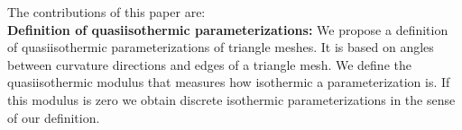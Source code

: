 \documentclass[twoside]{article}
\begin{document}


\newpage
\noindent The contributions of this paper are:\\
\noindent\textbf{Definition of quasiisothermic parameterizations:} 
We propose a definition of quasiisothermic parameterizations of triangle meshes. 
It is based on angles between curvature directions and edges of a triangle mesh.
We define the quasiisothermic modulus that measures how isothermic a 
parameterization is. If this modulus is zero we obtain discrete isothermic 
parameterizations in the sense of our definition.



%
\end{document}
